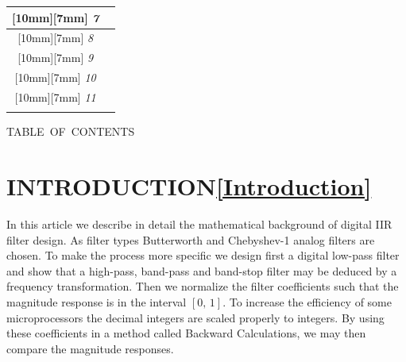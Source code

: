 \documentclass{sebase}
\begin{document}
\begin{tabular}{||p{0.8cm}|p{13.5cm}||}
{\raisebox{0pt}[10mm][7mm]{}%
\emph{7}} & \multicolumn{1}{|c||}{%
\parbox{13cm}{}%
} \\ \hline
\multicolumn{1}{||c|}{%
\raisebox{0pt}[10mm][7mm]{}%
\emph{8}} & \multicolumn{1}{|c||}{%
\parbox{13cm}{}%
} \\ \hline
\multicolumn{1}{||c|}{%
\raisebox{0pt}[10mm][7mm]{}%
\emph{9}} & \multicolumn{1}{|c||}{%
\parbox{13cm}{}%
} \\ \hline
\multicolumn{1}{||c|}{%
\raisebox{0pt}[10mm][7mm]{}%
\emph{10}} & \multicolumn{1}{|c||}{%
\parbox{13cm}{}%
} \\ \hline
\multicolumn{1}{||c|}{%
\raisebox{0pt}[10mm][7mm]{}%
\emph{11}} & \multicolumn{1}{|c||}{%
\parbox{13cm}{}%
} \\ \hline
&  \\ \hline\hline
\end{tabular}
\clearpage%

TABLE\ OF\ CONTENTS

\TableOfContents
\clearpage%

\section{INTRODUCTION\label{Introduction}\protect\ref{Introduction}}

In this article we describe in detail the mathematical background of digital
IIR filter design. As filter types Butterworth and Chebyshev-1 analog
filters are chosen. To make the process more specific we design first a
digital low-pass filter and show that a high-pass, band-pass and band-stop
filter may be deduced by a frequency transformation. Then we normalize the
filter coefficients such that the magnitude response is in the interval $%
[0,\,1]$. To increase the efficiency of some microprocessors the decimal
integers are scaled properly to integers. By using these coefficients in a
method called Backward Calculations, we may then compare the magnitude
responses.
\end{document}
